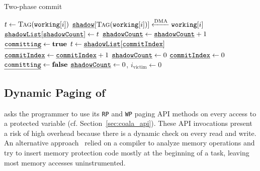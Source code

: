 \begin{algorithm}[t]
	\caption{Two-phase commit}
	\label{algo:commit}
	\scriptsize
	\begin{algorithmic}[1]
         
                \State $t \gets \Call{Tag}{\texttt{working}[i]}$
                \State $\texttt{\underline{shadow}}[\Call{Tag}{\texttt{working}[i]}] \xleftarrow{\text{DMA}} \texttt{working}[i]$
                \State $\texttt{\underline{shadowList}}[\texttt{\underline{shadowCount}}] \gets t$
                \State $\texttt{\underline{shadowCount}} \gets \texttt{\underline{shadowCount}} + 1$
            \EndFor
            \State {}
        \EndProcedure
         
            \State $\texttt{\underline{committing}} \gets \textbf{true}$
                \State $t \gets \texttt{\underline{shadowList}}[\texttt{\underline{commitIndex}}]$
                \State {}
                \State $\texttt{\underline{commitIndex}} \gets \texttt{\underline{commitIndex}} + 1$
            \EndWhile
            \State $\texttt{\underline{shadowCount}} \gets 0$
            \State $\texttt{\underline{commitIndex}} \gets 0$
            \State $\texttt{\underline{committing}} \gets \textbf{false}$
        \EndProcedure
         
             
            \EndIf 
            \State $\texttt{\underline{shadowCount}} \gets 0$, $i_\text{victim} \gets 0$
        \EndProcedure
	\end{algorithmic}
\end{algorithm}



\subsection{Dynamic Paging of \sys}

\sys asks the programmer to use its {\tt RP} and {\tt WP} paging API methods on
every access to a protected variable (cf. Section~\ref{sec:coala_api}).  These
API invocations present a risk of high overhead because there is a dynamic
check on every read and write. An alternative approach~\cite{alpaca} relied on a compiler to analyze memory operations and try to insert memory protection code mostly at the beginning of a task, leaving most
memory accesses uninstrumented.  

